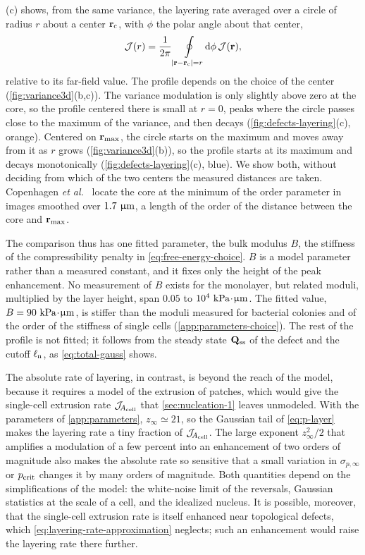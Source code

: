 \documentclass[aps,pre,reprint,superscriptaddress,longbibliography,nofootinbib
]{revtex4-2}
\begin{document}
(c) shows, from the same
variance, the layering rate averaged over a circle of
radius $r$ about a center $\mathbf{r}_\mathrm c$, with $\phi$ the
polar angle about that center,
\begin{equation}
    \label{eq:p-layer-radial}
    \mathcal{J}(r) = \frac{1}{2\pi} \oint\limits_{|\mathbf{r}-\mathbf{r}_\mathrm c|=r}\!\mathrm{d}\phi\,\mathcal{J}(\mathbf{r}),
\end{equation}
relative to its far-field value. The profile depends on the
choice of the center (\cref{fig:variance3d}(b,c)). The
variance modulation is only slightly above zero at the
core, so the profile centered there is small at $r=0$,
peaks where the circle passes close to the maximum of the
variance, and then decays (\cref{fig:defects-layering}(c),
orange). Centered on $\mathbf{r}_\mathrm{max}$, the circle starts
on the maximum and moves away from it as $r$ grows
(\cref{fig:variance3d}(b)), so the profile starts at its
maximum and decays monotonically
(\cref{fig:defects-layering}(c), blue). We show both,
without deciding from which of the two centers the measured
distances are taken. Copenhagen \textit{et
al.}~\cite{copenhagen2021} locate the core at the minimum
of the order parameter in images smoothed over
$1.7~\upmu\mathrm{m}$, a length of the order of the distance
between the core and $\mathbf{r}_\mathrm{max}$.


The comparison thus has one fitted parameter, the bulk
modulus $B$, the stiffness of the compressibility penalty
in \cref{eq:free-energy-choice}. $B$ is a model parameter
rather than a measured constant, and it fixes only the
height of the peak enhancement. No measurement of $B$
exists for the monolayer, but related moduli, multiplied by
the layer height, span $0.05$ to $10^4~\text{kPa}\mkern1mu\mathord{\cdot}\mkern1mu\upmu\mathrm{m}$.
The fitted value, $B=90~\text{kPa}\mkern1mu\mathord{\cdot}\mkern1mu\upmu\mathrm{m}$, is stiffer than
the moduli measured for bacterial colonies and of the order
of the stiffness of single cells
(\cref{app:parameters-choice}). The rest of the profile is
not fitted; it follows from the steady state $\mathbf{Q}_{\mathrm{ss}}$ of
the defect and the cutoff $\ell_{\rm n}$, as \cref{eq:total-gauss}
shows.

The absolute rate of layering, in contrast, is beyond the
reach of the model, because it requires a model of the
extrusion of patches, which would give the single-cell
extrusion rate $\mathcal{J}_{\!{A_{\rm cell}}}$ that
\cref{sec:nucleation-1} leaves unmodeled. With the
parameters of \cref{app:parameters}, $z_\infty\simeq21$, so
the Gaussian tail of \cref{eq:p-layer} makes the layering
rate a tiny fraction of $\mathcal{J}_{\!{A_{\rm cell}}}$. The large
exponent $z_\infty^2/2$ that amplifies a modulation of a
few percent into an enhancement of two orders of magnitude
also makes the absolute rate so sensitive that a small
variation in $\sigma_{p,\infty}$ or $p_{\rm crit}$ changes it by
many orders of magnitude. Both quantities depend on the
simplifications of the model: the white-noise limit of the
reversals, Gaussian statistics at the scale of a cell, and
the idealized nucleus. It is possible, moreover, that the
single-cell extrusion rate is itself enhanced near
topological defects, which
\cref{eq:layering-rate-approximation} neglects; such an
enhancement would raise the layering rate there further.
\end{document}
